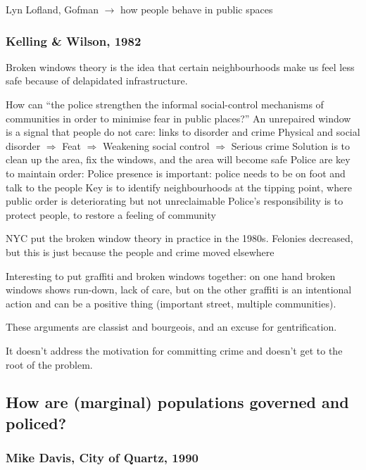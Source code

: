 \documentclass{article}
\begin{document}
Lyn Lofland, Gofman $\rightarrow$ how people behave in public spaces

\subsubsection{Kelling \& Wilson, 1982}

Broken windows theory is the idea that certain neighbourhoods make us feel less safe because of delapidated infrastructure.

\begin{outline}
	\1 How can ``the police strengthen the informal social-control mechanisms of communities in order to minimise fear in public places?''
	\1 An unrepaired window is a signal that people do not care: links to disorder and crime
	\1 Physical and social disorder $\Rightarrow$ Feat $\Rightarrow$ Weakening social control $\Rightarrow$ Serious crime
	\1 Solution is to clean up the area, fix the windows, and the area will become safe
	\1 Police are key to maintain order:
		\2 Police presence is important: police needs to be on foot and talk to the people
		\2 Key is to identify neighbourhoods at the tipping point, where public order is deteriorating but not unreclaimable 
		\2 Police's responsibility is to protect people, to restore a feeling of community
\end{outline}

NYC put the broken window theory in practice in the 1980s. Felonies decreased, but this is just because the people and crime moved elsewhere

Interesting to put graffiti and broken windows together: on one hand broken windows shows run-down, lack of care, but on the other graffiti is an intentional action and can be a positive thing (important street, multiple communities).

These arguments are classist and bourgeois, and an excuse for gentrification.

It doesn't address the motivation for committing crime and doesn't get to the root of the problem.

\subsection{How are (marginal) populations governed and policed?}

\subsubsection{Mike Davis, City of Quartz, 1990}
\end{document}
